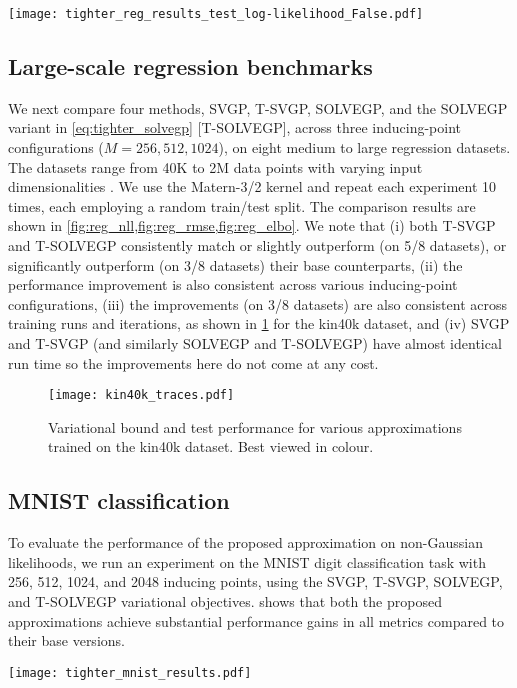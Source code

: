 \begin{figure*}[t]
    \centering
    \texttt{[image: tighter\_reg\_results\_test\_log-likelihood\_False.pdf]}
    \caption{Test log-likelihood for various sparse approximations on eight regression datasets and various numbers of pseudo-points. For SOLVEGP and T-SOLVEGP, M is evenly split for $\vu$ and $\vv$. Higher is better. Best viewed in colour.}
    \label{fig:reg_nll}
\end{figure*}


\subsection{Large-scale regression benchmarks}
\label{sec:exp_reg}
We next compare four methods, SVGP, T-SVGP, SOLVEGP, and the SOLVEGP variant in \cref{eq:tighter_solvegp} [T-SOLVEGP], across three inducing-point configurations ($M=256, 512, 1024$), on eight medium to large regression datasets. The datasets range from 40K to 2M data points with varying input dimensionalities \citep{yang15b}. We use the Matern-3/2 kernel and repeat each experiment 10 times, each employing a random train/test split. The comparison results are shown in \cref{fig:reg_nll,fig:reg_rmse,fig:reg_elbo}.
We note that (i) both T-SVGP and T-SOLVEGP consistently match or slightly outperform (on 5/8 datasets), or significantly outperform (on 3/8 datasets) their base counterparts, (ii) the performance improvement is also consistent across various inducing-point configurations, (iii) the improvements (on 3/8 datasets) are also consistent across training runs and iterations, as shown in \cref{fig:kin40k_traces} for the kin40k dataset, and (iv) SVGP and T-SVGP (and similarly SOLVEGP and T-SOLVEGP) have almost identical run time so the improvements here do not come at any cost. 


\begin{figure}[!t]
    \centering
    \texttt{[image: kin40k\_traces.pdf]}
    \caption{Variational bound and test performance for various approximations trained on the kin40k dataset. Best viewed in colour.}
    \label{fig:kin40k_traces}
\end{figure}

\subsection{MNIST classification}
\label{sec:exp_mnist}
To evaluate the performance of the proposed approximation on non-Gaussian likelihoods, we run an experiment on the MNIST digit classification task with 256, 512, 1024, and 2048 inducing points, using the SVGP, T-SVGP, SOLVEGP, and T-SOLVEGP variational objectives.  shows that both the proposed approximations achieve substantial performance gains in all metrics compared to their base versions. 
\begin{figure*}[!t]
    \centering
    \texttt{[image: tighter\_mnist\_results.pdf]}
    \caption{Log marginal likelihood approximations and test performance on the MNIST 10-way classification task. Best viewed in colour.}
    \label{fig:mnist_results}
\end{figure*}


